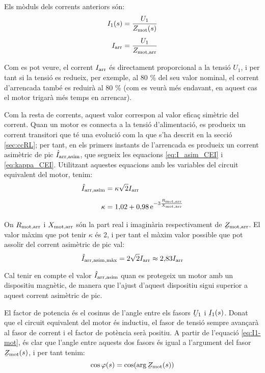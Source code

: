 Els mòduls dels corrents anteriors són:
\begin{subequations}
\begin{align}
    I_1(s) &= \frac{U_1}{Z_\mathrm{mot}(s)} \label{eq:mot-I1}\\[1ex]
    I_\mathrm{arr} &= \frac{U_1}{Z_\mathrm{mot,arr}}
\end{align}
\end{subequations}

Com es pot veure, el corrent $I_\mathrm{arr}$ és directament proporcional a la tensió $U_1$, i per tant si la tensió es redueix, per exemple, al 80 \% del seu valor nominal, el corrent d'arrencada també es reduirà al 80 \% (com es veurà més endavant, en aquest cas el motor trigarà més temps en arrencar).

Com la resta de corrents, aquest valor correspon al valor eficaç simètric del corrent. Quan un motor es connecta a la tensió d'alimentació, es produeix un corrent transitori que té una evolució com la que s'ha descrit en la secció \vref{sec:ccRL}; per tant, en els primers instants de l'arrencada es produeix un corrent asimètric de pic $\hat{I}_\mathrm{arr,asim}$, que segueix les equacions \eqref{eq:I_asim_CEI} i \eqref{eq:kappa_CEI}. Utilitzant aquestes equacions amb les variables del circuit equivalent del motor, tenim:
\begin{subequations}
\begin{align}
    \hat{I}_\mathrm{arr,asim} &= \kappa \sqrt{2} I_\mathrm{arr}  \\[1ex]
    \kappa &= 1{,}02 + 0{,}98 \,\mathrm{e}^{-3\frac{R_\mathrm{mot,arr}}{X_\mathrm{mot,arr}}}
\end{align}
\end{subequations}

On $R_\mathrm{mot,arr}$ i $X_\mathrm{mot,arr}$ són la part real i imaginària respectivament de $\cmplx{Z}\ped{mot,arr}$. El valor màxim que pot tenir  $\kappa$ és 2, i per tant el màxim valor possible que pot assolir del corrent asimètric de pic val:
\begin{equation}
	\hat{I}_\mathrm{arr,asim,\text{màx}} =  2\sqrt{2} I_\mathrm{arr} \approx 2{,}83 I_\mathrm{arr} 
\end{equation}

Cal tenir en compte el valor $\hat{I}_\mathrm{arr,asim}$ quan es protegeix un motor amb un dispositiu magnètic, de manera que l'ajust d'aquest dispositiu sigui superior a aquest corrent asimètric de  pic.

El factor de potencia és el cosinus de l'angle entre els fasors $\cmplx{U}_1$ i $\cmplx{I}_1(s)$. Donat que el circuit equivalent del motor és inductiu, el fasor de tensió sempre avançarà al fasor de corrent i el factor de potència serà positiu. A partir de l'equació \eqref{eq:I1-mot}, és clar que l'angle entre aquests dos fasors és igual a l'argument del fasor $\cmplx{Z}\ped{mot}(s)$, i per tant tenim:
\begin{equation}\index{motors d'inducció!factor de potència}
	\cos\varphi(s) = \cos(\arg\cmplx{Z}\ped{mot}(s))\label{eq:cos-fi-mot}
\end{equation}

